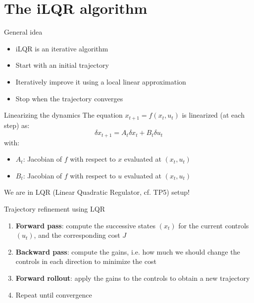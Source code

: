 \documentclass[aspectratio=169]{beamer}
\theoremstyle{definition}
\begin{document}
\section{The iLQR algorithm}
\begin{frame}{General idea}
    \begin{itemize}
        \item iLQR is an iterative algorithm
        \item Start with an initial trajectory
        \item Iteratively improve it using a local linear approximation
        \item Stop when the trajectory converges
    \end{itemize}
\end{frame}

\begin{frame}{Linearizing the dynamics}
    The equation $x_{t+1} = f(x_t, u_t)$ is linearized (at each step) as:
    \begin{equation*}
        \delta x_{t+1} = A_t \delta x_t + B_t \delta u_t
    \end{equation*}
    with:
    \begin{itemize}
        \item $A_t$: Jacobian of $f$ with respect to $x$ evaluated at $(x_t, u_t)$
        \item $B_t$: Jacobian of $f$ with respect to $u$ evaluated at $(x_t, u_t)$
    \end{itemize}
    We are in LQR (Linear Quadratic Regulator, cf. TP5) setup!
\end{frame}

\begin{frame}{Trajectory refinement using LQR}
    \begin{enumerate}
        \item \textbf{Forward pass}: compute the successive states $(x_t)$ for the current controls $(u_t)$, and the corresponding cost $J$
        \item \textbf{Backward pass}: compute the gains, i.e. how much we should change the controls in each direction to minimize the cost
        \item \textbf{Forward rollout}: apply the gains to the controls to obtain a new trajectory
        \item Repeat until convergence
    \end{enumerate}
\end{frame}
\end{document}
